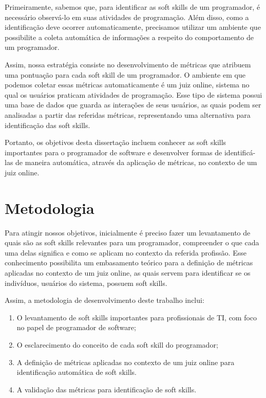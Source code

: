 Primeiramente, sabemos que, para identificar as soft skills de um programador, é necessário observá-lo em suas atividades de programação. Além disso, como a identificação deve ocorrer automaticamente, precisamos utilizar um ambiente que possibilite a coleta automática de informações a respeito do comportamento de um programador.

Assim, nossa estratégia consiste no desenvolvimento de métricas que atribuem uma pontuação para cada soft skill de um programador. O ambiente em que podemos coletar essas métricas automaticamente é um juiz online, sistema no qual os usuários praticam atividades de programação. Esse tipo de sistema possui uma base de dados que guarda as interações de seus usuários, as quais podem ser analisadas a partir das referidas métricas, representando uma alternativa para identificação das soft skills.

Portanto, os objetivos desta dissertação incluem conhecer as soft skills importantes para o programador de software e desenvolver formas de identificá-las de maneira automática, através da aplicação de métricas, no contexto de um juiz online.

\section{Metodologia}

Para atingir nossos objetivos, inicialmente é preciso fazer um levantamento de quais são as soft skills relevantes para um programador, compreender o que cada uma delas significa e como se aplicam no contexto da referida profissão. Esse conhecimento possibilita um embasamento teórico para a definição de métricas aplicadas no contexto de um juiz online, as quais servem para identificar se os indivíduos, usuários do sistema, possuem soft skills.

Assim, a metodologia de desenvolvimento deste trabalho inclui: 

\begin{enumerate}[label={(\roman*)}]
	\item O levantamento de soft skills importantes para profissionais de TI, com foco no papel de programador de software;
	\item O esclarecimento do conceito de cada soft skill do programador;
	\item A definição de métricas aplicadas no contexto de um juiz online para identificação automática de soft skills.
	\item A validação das métricas para identificação de soft skills.
\end{enumerate}

